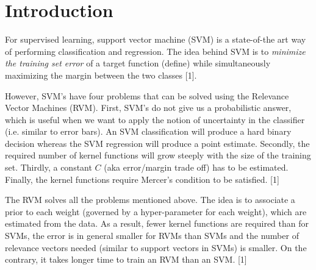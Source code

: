 \section{Introduction}
For supervised learning, support vector machine (SVM) is a state-of-the art way of performing classification and regression. The idea behind SVM is to \textit{minimize the training set error} of a target function (define) while simultaneously maximizing the margin between the two classes [1].

However, SVM's have four problems that can be solved using the Relevance Vector Machines (RVM). First, SVM's do not give us a probabilistic answer, which is useful when we want to apply the notion of uncertainty in the classifier (i.e. similar to error bars). An SVM classification will produce a hard binary decision whereas the SVM regression will produce a point estimate. Secondly, the required number of kernel functions will grow steeply with the size of the training set. Thirdly, a constant $C$ (aka error/margin trade off) has to be estimated. Finally, the kernel functions require Mercer's condition to be satisfied. [1]

The RVM solves all the problems mentioned above. The idea is to associate a prior to each weight (governed by a hyper-parameter for each weight), which are estimated from the data. As a result, fewer kernel functions are required than for SVMs, the error is in general smaller for RVMs than SVMs and the number of relevance vectors needed (similar to support vectors in SVMs) is smaller. On the contrary, it takes longer time to train an RVM than an SVM. [1]

